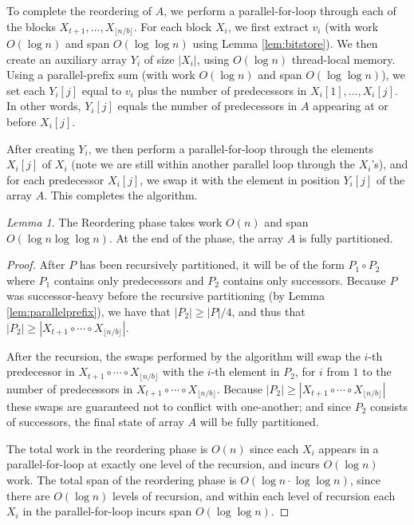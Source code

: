 \documentclass[twocolumn,10pt]{article}
\theoremstyle{remark}
\newtheorem{lemma}[thm]{Lemma}
\theoremstyle{remark}
\begin{document}
To complete the reordering of $A$, we perform a parallel-for-loop
through each of the blocks $X_{t + 1}, \ldots, X_{\lfloor n / b \rfloor}$. For each block
$X_i$, we first extract $v_i$ (with work $O(\log n)$ and span $O(\log
\log n)$ using Lemma \ref{lem:bitstore}). We then create an auxiliary
array $Y_i$ of size $|X_i|$, using $O(\log n)$ thread-local
memory. Using a parallel-prefix sum (with work $O(\log n)$ and span
$O(\log \log n)$), we set each $Y_i[j]$ equal to $v_i$ plus the number
of predecessors in $X_i[1], \ldots, X_i[j]$. In other words, $Y_i[j]$
equals the number of predecessors in $A$ appearing at or before
$X_i[j]$.

After creating $Y_i$, we then perform a parallel-for-loop through the
elements $X_i[j]$ of $X_i$ (note we are still within another parallel
loop through the $X_i$'s), and for each predecessor $X_i[j]$, we swap
it with the element in position $Y_i[j]$ of the array $A$. This
completes the algorithm.

\begin{lemma}
 The Reordering phase takes work $O(n)$ and span $O(\log n \log \log
 n)$. At the end of the phase, the array $A$ is fully partitioned.
\end{lemma}
\begin{proof}
  After $P$ has been recursively partitioned, it will be of the form
  $P_1 \circ P_2$ where $P_1$ contains only predecessors and $P_2$
  contains only successors. Because $P$ was successor-heavy before the
  recursive partitioning (by Lemma \ref{lem:parallelprefix}), we have
  that $|P_2| \ge |P| / 4$, and thus that
  $|P_2| \ge |X_{t + 1} \circ \cdots \circ X_{\lfloor n / b
    \rfloor}|$.

After the recursion, the swaps performed by the algorithm will swap
the $i$-th predecessor in $X_{t + 1} \circ \cdots \circ X_{\lfloor n /
  b \rfloor}$ with the $i$-th element in $P_2$, for $i$ from $1$ to
the number of predecessors in $X_{t + 1} \circ \cdots \circ X_{\lfloor
  n / b \rfloor}$. Because $|P_2| \ge |X_{t + 1} \circ \cdots \circ
X_{\lfloor n / b \rfloor}|$ these swaps are guaranteed not to conflict
with one-another; and since $P_2$ consists of successors, the final
state of array $A$ will be fully partitioned.

The total work in the reordering phase is $O(n)$ since each $X_i$
appears in a parallel-for-loop at exactly one level of the recursion,
and incurs $O(\log n)$ work. The total span of the reordering phase is
$O(\log n \cdot \log \log n)$, since there are $O(\log n)$ levels of
recursion, and within each level of recursion each $X_i$ in the
parallel-for-loop incurs span $O(\log \log n)$. 
\end{proof}
\end{document}

